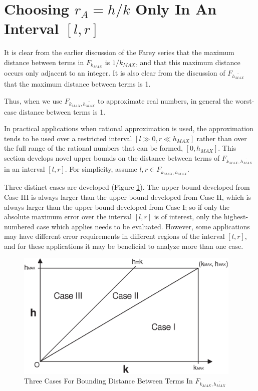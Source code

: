 \documentclass{esub2acm}
\begin{document}
\section{Choosing $r_A = h/k$ Only In An Interval $[l,r]$}
\label{sec:intervalcase}

It is clear from the earlier discussion of the Farey series that the maximum
distance between terms in $F_{k_{MAX}}$ is $1/k_{MAX}$, and that this maximum
distance occurs only adjacent to an integer.  It is also clear from the
discussion of $F_{\overline{h_{MAX}}}$ that the maximum distance between terms
is 1.

Thus, when we use $F_{k_{MAX}, \overline{h_{MAX}}}$ to approximate real numbers,
in general the worst-case distance between terms is 1.

In practical applications when rational approximation is used,
the approximation tends to be used over a restricted interval
$[l \gg  0, r \ll h_{MAX}]$ rather than over the full range of the rational numbers that
can be formed, $[0, h_{MAX}]$.  This section develops novel upper bounds on
the distance between terms of $F_{k_{MAX}, \overline{h_{MAX}}}$ in an interval
$[l,r]$.  For simplicity, assume $l,r \in F_{k_{MAX}, \overline{h_{MAX}}}$.

Three distinct cases are developed (Figure \ref{fig:threecases}).
The upper bound developed from Case III is always larger than the upper
bound developed from Case II, which is always larger than the upper bound developed
from Case I; so if only the absolute maximum error over
the interval $[l,r]$ is of interest, only the
highest-numbered case which applies needs to be evaluated.  However, some
applications may have different error requirements in different regions
of the interval $[l,r]$, and for these applications it may be beneficial
to analyze more than one case.

\begin{figure}
\centering
\includegraphics[width=4.25in]{intlat02.eps}
\caption{Three Cases For Bounding Distance Between Terms In $F_{k_{MAX}, \overline{h_{MAX}}}$}
\label{fig:threecases}
\end{figure}
\end{document}
